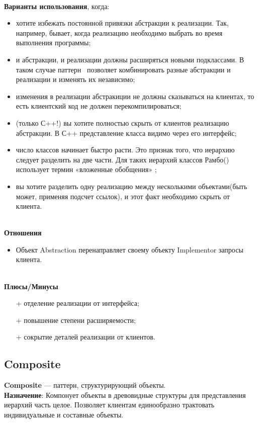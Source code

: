 \documentclass[a3paper,11pt]{report}
\begin{document}
\large\textbf{\\Варианты использования}, когда:
\begin{itemize}
\item хотите избежать постоянной привязки абстракции к реализации. Так, например, бывает, когда реализацию необходимо выбрать во время выполнения программы;
\item и абстракции, и реализации должны расширяться новыми подклассами. В таком случае паттерн \ позволяет комбинировать разные абстракции и реализации и изменять их независимо;
\item изменения в реализации абстракиции не должны сказываться на клиентах, то есть клиентский код не должен перекомпилироваться;
\item (только С++!) вы хотите полностью скрыть от клиентов реализацию абстракции. В С++ представление класса видимо через его интерфейс;
\item число классов начинает быстро расти. Это признак того, что иерархию следует разделить на две части. Для таких иерархий классов Рамбо() использует термин «вложенные обобщения» ;
\item вы хотите разделить одну реализацию между несколькими объектами(быть может, применяя подсчет ссылок), и этот факт необходимо скрыть от клиента.
\end{itemize}

\textbf{\\Отношения}
\begin{itemize}
\item Объект Abstraction перенаправляет своему объекту Implementor запросы клиента.
\end{itemize}

\textbf{\\Плюсы/Минусы}
\begin{itemize}
\item [+] отделение реализации от интерфейса;
\item [+] повышение степени расширяемости;
\item [+] сокрытие деталей реализации от клиентов.
\end{itemize}

\newpage
\subsection{Composite}

\large\textbf{Composite} --- паттерн, структурирующий объекты.
\\
\large\textbf{Назначение}: Компонует объекты в древовидные структуры для представления иерархий часть целое. Позволяет клиентам единообразно трактовать индивидуальные и составные объекты.
\\
\end{document}
